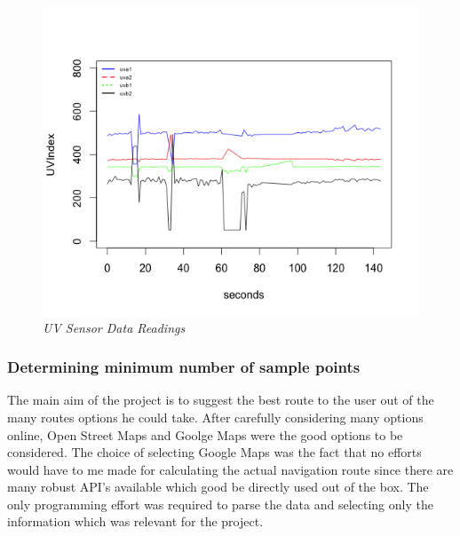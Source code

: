 \documentclass[12pt,fullpage,doublespace]{article}
\begin{document}
\begin{figure}
\begin{center}
\includegraphics[scale=0.45]{dataAnalysis.png}
\caption{\small \sl UV Sensor Data Readings\label{fig:dataAnalysis}}
\end{center}
\end{figure}



\subsubsection{Determining minimum number of sample points}
The main aim of the project is to suggest the best route to the user out of the many routes options he could take. After carefully considering many options online, Open Street Maps \cite{openStreetMap} and Goolge Maps \cite{googleMapsOriginal} were the good options to be considered. The choice of selecting Google Maps was the fact that no efforts would have to me made for calculating the actual navigation route since there are many robust API's available which good be directly used out of the box. The only programming effort was required to parse the data and selecting only the information which was relevant for the project. 
\end{document}
